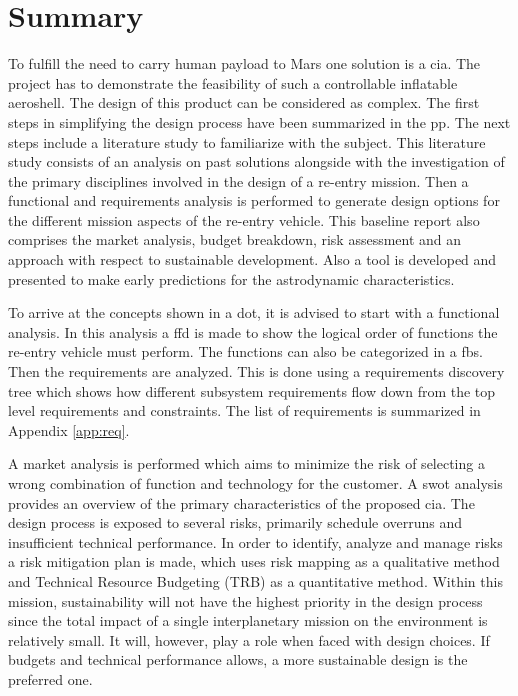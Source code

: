 \section*{Summary}\label{cha:summary}

To fulfill the need to carry human payload to Mars one solution is a \acrfull{cia}. The project has to demonstrate the feasibility of such a controllable inflatable aeroshell. The design of this product can be considered as complex. The first steps in simplifying the design process have been summarized in the \acrfull{pp}. The next steps include a literature study to familiarize with the subject. This literature study consists of an analysis on past solutions alongside with the investigation of the primary disciplines involved in the design of a re-entry mission. Then a functional and requirements analysis is performed to generate design options for the different mission aspects of the re-entry vehicle. This baseline report also comprises the market analysis, budget breakdown, risk assessment and an approach with respect to sustainable development. Also a tool is developed and presented to make early predictions for the astrodynamic characteristics. 

To arrive at the concepts shown in a \acrfull{dot}, it is advised to start with a functional analysis. In this analysis a \acrfull{ffd} is made to show the logical order of functions the re-entry vehicle must perform. The functions can also be categorized in a \acrfull{fbs}. Then the requirements are analyzed. This is done using a requirements discovery tree which shows how different subsystem requirements flow down from the top level requirements and constraints. The list of requirements is summarized in Appendix \ref{app:req}.

A market analysis is performed which aims to minimize the risk of selecting a wrong combination of function and technology for the customer. A \acrfull{swot} analysis provides an overview of the primary characteristics of the proposed \gls{cia}. The design process is exposed to several risks, primarily schedule overruns and insufficient technical performance. In order to identify, analyze and manage risks a risk mitigation plan is made, which uses risk mapping as a qualitative method and Technical Resource Budgeting (TRB) as a quantitative method. Within this mission, sustainability will not have the highest priority in the design process since the total impact of a single interplanetary mission on the environment is relatively small. It will, however, play a role when faced with design choices. If budgets and technical performance allows, a more sustainable design is the preferred one.

